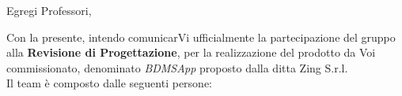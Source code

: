 \documentclass[10pt,a4paper,sans]{moderncv}        %
\begin{document}
\date{\emph{2015-04-20}}
\opening{Egregi Professori,}
\makelettertitle

Con la presente, intendo comunicarVi ufficialmente la partecipazione del gruppo \groupName{} alla \textbf{Revisione di Progettazione}, per la realizzazione del prodotto da Voi commissionato, denominato \textit{BDMSApp} proposto dalla ditta Zing S.r.l.\\
Il team è composto dalle seguenti persone: 
\end{document}
